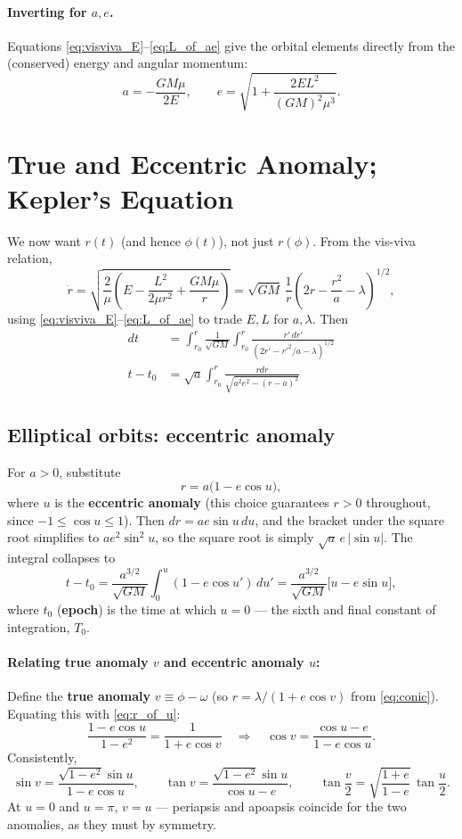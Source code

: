 \documentclass[11pt]{article}
\begin{document}
\paragraph{Inverting for $a,e$.} Equations \eqref{eq:visviva_E}--\eqref{eq:L_of_ae} give the orbital elements directly from the (conserved) energy and angular momentum:
\begin{equation}
a=-\frac{GM\mu}{2E},\qquad e=\sqrt{1+\frac{2EL^2}{(GM)^2\mu^3}}. \label{eq:a_e_from_EL}
\end{equation}

\section{True and Eccentric Anomaly; Kepler's Equation}

We now want $r(t)$ (and hence $\phi(t)$), not just $r(\phi)$. From the vis-viva relation,
\[
\dot r = \sqrt{\frac{2}{\mu}\left(E-\frac{L^2}{2\mu r^2}+\frac{GM\mu}{r}\right)}
=\sqrt{GM}\,\frac1r\left(2r-\frac{r^2}{a}-\lambda\right)^{1/2},
\]
using \eqref{eq:visviva_E}--\eqref{eq:L_of_ae} to trade $E,L$ for $a,\lambda$. Then
\begin{align}
	 dt&=\int_{r_0}^{r}\frac{1}{\sqrt{GM}}\int_{r_0}^{r}\frac{r'\,dr'}{\left(2r'-r'^2/a-\lambda\right)^{1/2}}\\
	t-t_0&=\sqrt{a}\int_{r_0}^{r}\frac{rdr}{\sqrt{a^2e^2-(r-a)^2}}\tag{using $\lambda=a(1-e^2)$}
\end{align}
\subsection{Elliptical orbits: eccentric anomaly}
For $a>0$, substitute
\begin{equation}
r=a\big(1-e\cos u\big), \label{eq:r_of_u}
\end{equation}
where $u$ is the \textbf{eccentric anomaly} (this choice guarantees $r>0$ throughout, since $-1\le\cos u\le1$). Then $dr=ae\sin u\,du$, and the bracket under the square root simplifies to $a e^2\sin^2u$, so the square root is simply $\sqrt a\, e\,|\sin u|$. The integral collapses to
\[
t-t_0=\frac{a^{3/2}}{\sqrt{GM}}\int_0^u (1-e\cos u')\,du' = \frac{a^{3/2}}{\sqrt{GM}}\big[u-e\sin u\big],
\]
where $t_0$ (\textbf{epoch}) is the time at which $u=0$ — the sixth and final constant of integration, $T_0$.

\paragraph{Relating true anomaly $v$ and eccentric anomaly $u$:}
Define the \textbf{true anomaly} $v\equiv\phi-\omega$ (so $r=\lambda/(1+e\cos v)$ from \eqref{eq:conic}). Equating this with \eqref{eq:r_of_u}:
\[
\frac{1-e\cos u}{1-e^2}=\frac{1}{1+e\cos v}
\quad\Longrightarrow\quad
\cos v = \frac{\cos u - e}{1-e\cos u}. \tag{65a}
\]
Consistently,
\begin{equation}
\sin v = \frac{\sqrt{1-e^2}\sin u}{1-e\cos u},\qquad
\tan v = \frac{\sqrt{1-e^2}\sin u}{\cos u - e},\qquad
\tan\frac v2 = \sqrt{\frac{1+e}{1-e}}\,\tan\frac u2. \label{eq:v_of_u}
\end{equation}
At $u=0$ and $u=\pi$, $v=u$ — periapsis and apoapsis coincide for the two anomalies, as they must by symmetry.
\end{document}
